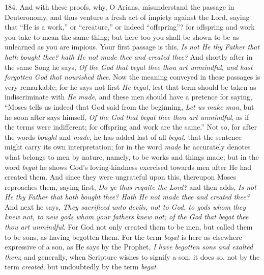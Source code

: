 184. And with these proofs,
why, O Arians, misunderstand the passage in Deuteronomy, and thus
venture a fresh act of impiety against the Lord, saying that ``He is a
work,'' or ``creature,'' or indeed ``offspring''? for offspring and work
you take to mean the same thing; but here too you shall be shown to be
as unlearned as you are impious. Your first passage is this, \emph{Is not
He thy Father that hath bought thee? hath He not made thee and created
thee?} And shortly after in the same Song he says, \emph{Of the God
that begat thee thou art unmindful, and hast forgotten God that
nourished thee}. Now the meaning conveyed in these passages is very
remarkable; for he says not first \emph{He begat}, lest that term
should be taken as indiscriminate with \emph{He made}, and these men
should have a pretence for saying, ``Moses tells us indeed that God
said from the beginning, \emph{Let us make man}, but he soon after
says himself, \emph{Of the God that begat thee thou art unmindful}, as
if the terms were indifferent; for offspring and work are the same.''
Not so, for after the words \emph{bought} and \emph{made}, he has
added last of all \emph{begat}, that the sentence might carry its own
interpretation; for in the word \emph{made} he accurately denotes what
belongs to men by nature, namely, to be works and things made; but in
the word \emph{begat} he shows God's loving-kindness exercised towards
men after He had created them. And since they were ungrateful upon
this, thereupon Moses reproaches them, saying first, \emph{Do ye
thus requite the Lord?} and then adds, \emph{Is not He thy Father that
hath bought thee? Hath He not made thee and created thee?} And next
he says, \emph{They sacrificed unto devils, not to God, to gods whom they
knew not, to new gods whom your fathers knew not; of the God that
begat thee thou art unmindful}. For God not only created them to be
men, but called them to be sons, as having begotten them. For the term
\emph{begat} is here as elsewhere expressive of a son, as He says by
the Prophet, \emph{I have begotten sons and exalted them}; and
generally, when Scripture wishes to signify a son, it does so, not by
the term \emph{created}, but undoubtedly by the term \emph{begat}.

